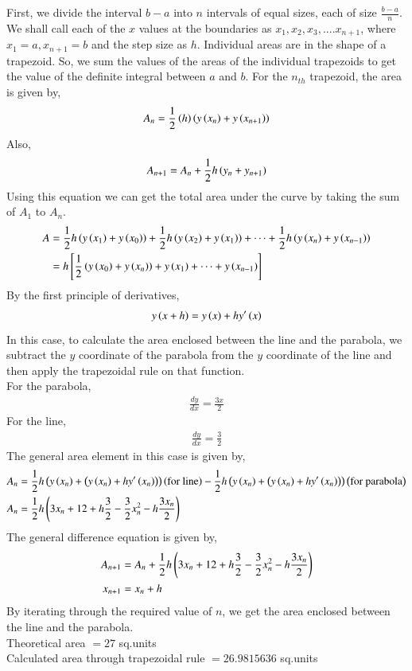 \documentclass[journal]{IEEEtran}
\begin{document}
First, we divide the interval $b-a$ into $n$ intervals of equal sizes, each of size $\frac{b-a}{n}$. We shall call each of the $x$ values at the boundaries as $x_1, x_2, x_3,....x_{n+1}$, where $x_1 = a, x_{n+1} = b$ and the step size as $h$. Individual areas are in the shape of a trapezoid. So, we sum the values of the areas of the individual trapezoids to get the value of the definite integral between $a$ and $b$. For the $n_{th}$ trapezoid, the area is given by,
\begin{align}
	A_n = \frac{1}{2} \left(h\right) \left(y\left(x_n\right) + y\left(x_{n+1}\right)\right)
\end{align}
Also,
\begin{align}
	A_{n+1} = A_n + \frac{1}{2} h \left(y_n + y_{n+1}\right)
\end{align}
Using this equation we can get the total area under the curve by taking the sum of $A_1$ to $A_n$.\\
\begin{align}
	A &= \frac{1}{2} h \left(y \left(x_1\right) + y \left(x_0\right)\right)+ \frac{1}{2} h \left(y \left(x_2\right) + y \left(x_1\right)\right) + \dots + \frac{1}{2} h \left(y \left(x_n\right) + y\left(x_{n-1}\right)\right)\\
	&= h {}\left[\frac{1}{2} \left(y \left(x_0\right) + y \left(x_n\right)\right) + y \left(x_1\right) + \dots + y \left(x_{n-1}\right)\right]
\end{align}
By the first principle of derivatives,\\
\begin{align}
	y\left(x+h\right) = y\left(x\right) + h y^{\prime}\left(x\right)
\end{align}
In this case, to calculate the area enclosed between the line and the parabola, we subtract the $y$ coordinate of the parabola from the $y$ coordinate of the line and then apply the trapezoidal rule on that function.\\
For the parabola,
\begin{align}
	\frac{dy}{dx} = \frac{3x}{2}
\end{align}
For the line,
\begin{align}
	\frac{dy}{dx} = \frac{3}{2}
\end{align}
The general area element in this case is given by,
\begin{align}
	A_n &= \frac{1}{2} h \left(y\left(x_n\right) + \left(y\left(x_n\right) + hy^\prime\left(x_n\right)\right)\right)\left(\text{for line}\right) - \frac{1}{2} h \left(y\left(x_n\right) + \left(y\left(x_n\right) + hy^\prime\left(x_n\right)\right)\right)\left(\text{for parabola}\right)\\
	A_n &= \frac{1}{2} h \left(3x_n + 12 + h\frac{3}{2} - \frac{3}{2}x_n^2 - h\frac{3x_n}{2}\right)\\
\end{align}
The general difference equation is given by,
\begin{align}
	A_{n+1} &= A_n + \frac{1}{2}h\left(3x_n + 12 + h\frac{3}{2} - \frac{3}{2}x_n^2 - h\frac{3x_n}{2}\right)\\
	x_{n+1} &= x_n + h
\end{align}
By iterating through the required value of $n$, we get the area enclosed between the line and the parabola.\\
Theoretical area $= 27$ sq.units\\
Calculated area through trapezoidal rule $= 26.9815636$ sq.units\\
\end{document}

